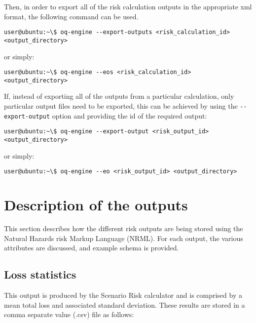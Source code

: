 Then, in order to export all of the risk calculation outputs in the appropriate xml
format, the following command can be used.

\begin{Verbatim}[frame=single, commandchars=\\\{\}, samepage=true]
user@ubuntu:~\$ oq-engine --export-outputs <risk_calculation_id>
<output_directory>
\end{Verbatim}

or simply:

\begin{Verbatim}[frame=single, commandchars=\\\{\}, samepage=true]
user@ubuntu:~\$ oq-engine --eos <risk_calculation_id> <output_directory>
\end{Verbatim}

If, instead of exporting all of the outputs from a particular calculation,
only particular output files need to be exported, this can be achieved by
using the \Verb+--export-output+ option and providing the id of the required
output:

\begin{Verbatim}[frame=single, commandchars=\\\{\}, samepage=true]
user@ubuntu:~\$ oq-engine --export-output <risk_output_id> <output_directory>
\end{Verbatim}

or simply:

\begin{Verbatim}[frame=single, commandchars=\\\{\}, samepage=true]
user@ubuntu:~\$ oq-engine --eo <risk_output_id> <output_directory>
\end{Verbatim}


\section{Description of the outputs}

This section describes how the different risk outputs are being stored using
the Natural Hazards risk Markup Language (NRML). For each output, the various
attributes are discussed, and example schema is provided.

\subsection{Loss statistics}

This output is produced by the Scenario Risk calculator and is comprised by a mean total loss and associated standard deviation. These results are stored in a comma separate value (.csv) file as follows:

